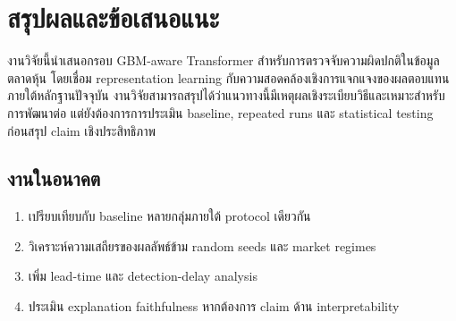 \chapter{สรุปผลและข้อเสนอแนะ}

งานวิจัยนี้นำเสนอกรอบ GBM-aware Transformer สำหรับการตรวจจับความผิดปกติในข้อมูลตลาดหุ้น โดยเชื่อม representation learning กับความสอดคล้องเชิงการแจกแจงของผลตอบแทน ภายใต้หลักฐานปัจจุบัน งานวิจัยสามารถสรุปได้ว่าแนวทางนี้มีเหตุผลเชิงระเบียบวิธีและเหมาะสำหรับการพัฒนาต่อ แต่ยังต้องการการประเมิน baseline, repeated runs และ statistical testing ก่อนสรุป claim เชิงประสิทธิภาพ

\section{งานในอนาคต}

\begin{enumerate}
  \item เปรียบเทียบกับ baseline หลายกลุ่มภายใต้ protocol เดียวกัน
  \item วิเคราะห์ความเสถียรของผลลัพธ์ข้าม random seeds และ market regimes
  \item เพิ่ม lead-time และ detection-delay analysis
  \item ประเมิน explanation faithfulness หากต้องการ claim ด้าน interpretability
\end{enumerate}

